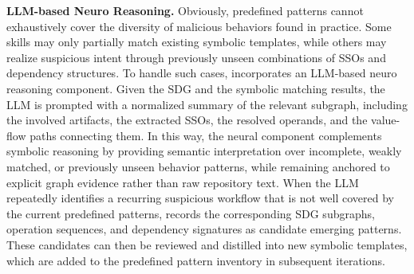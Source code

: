 \noindent \textbf{LLM-based Neuro Reasoning.}
Obviously, predefined patterns cannot exhaustively cover the diversity of malicious behaviors found in practice. Some skills may only partially match existing symbolic templates, while others may realize suspicious intent through previously unseen combinations of SSOs and dependency structures. To handle such cases, \toolname incorporates an LLM-based neuro reasoning component. Given the SDG and the symbolic matching results, the LLM is prompted with a normalized summary of the relevant subgraph, including the involved artifacts, the extracted SSOs, the resolved operands, and the value-flow paths connecting them. In this way, the neural component complements symbolic reasoning by providing semantic interpretation over incomplete, weakly matched, or previously unseen behavior patterns, while remaining anchored to explicit graph evidence rather than raw repository text. When the LLM repeatedly identifies a recurring suspicious workflow that is not well covered by the current predefined patterns, \toolname records the corresponding SDG subgraphs, operation sequences, and dependency signatures as candidate emerging patterns. These candidates can then be reviewed and distilled into new symbolic templates, which are added to the predefined pattern inventory in subsequent iterations. 